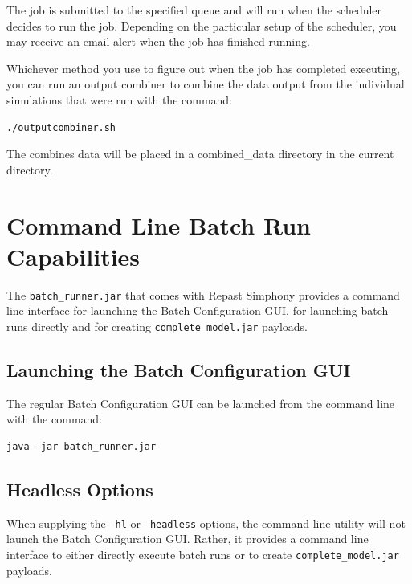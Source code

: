 \documentclass[11pt]{amsart}
\begin{document}
The job is submitted to the specified queue and will run when the scheduler decides to run the job. Depending on the particular setup of the scheduler, you may receive an email alert when the job has finished running. 

Whichever method you use to figure out when the job has completed executing, you can run an output combiner to combine the data output from the individual simulations that were run with the command:
\begin{verbatim}
./outputcombiner.sh
\end{verbatim}
The combines data will be placed in a combined\_data directory in the current directory.

\section{Command Line Batch Run Capabilities}
The {\tt batch\_runner.jar} that comes with Repast Simphony provides a command line interface for launching the Batch Configuration GUI, for launching batch runs directly and for creating {\tt complete\_model.jar} payloads.

\subsection{Launching the Batch Configuration GUI}
The regular Batch Configuration GUI can be launched from the command line with the command:
\begin{verbatim}
java -jar batch_runner.jar
\end{verbatim}


\subsection{Headless Options}
When supplying the {\tt-hl} or {\tt--headless} options, the command line utility will not launch the Batch Configuration GUI. Rather, it provides a command line interface to either directly execute batch runs or to create  {\tt complete\_model.jar} payloads.
\end{document}
